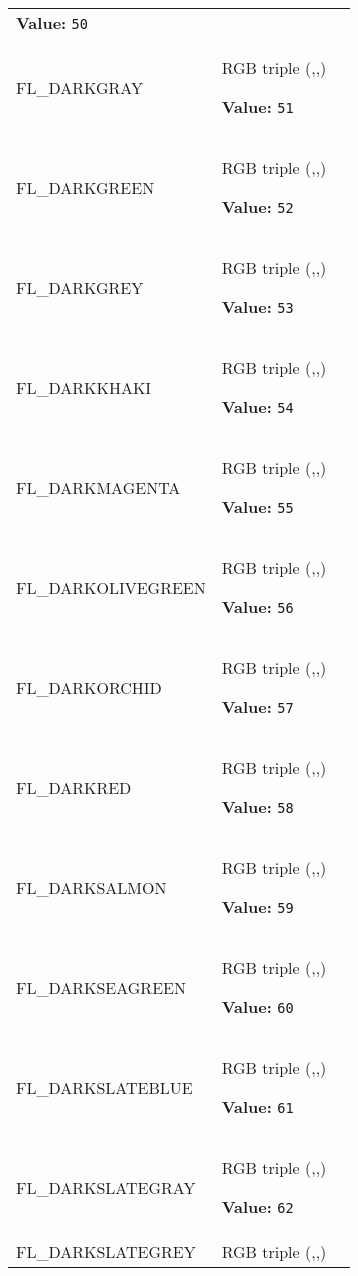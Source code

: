 \begin{longtable}{|p{\varnamewidth}|p{\vardescrwidth}|l}
\textbf{Value:} 
{\tt 50}&\\
\cline{1-2}
\raggedright F\-L\-\_\-D\-A\-R\-K\-G\-R\-A\-Y\- & \raggedright RGB triple (,,)

\textbf{Value:} 
{\tt 51}&\\
\cline{1-2}
\raggedright F\-L\-\_\-D\-A\-R\-K\-G\-R\-E\-E\-N\- & \raggedright RGB triple (,,)

\textbf{Value:} 
{\tt 52}&\\
\cline{1-2}
\raggedright F\-L\-\_\-D\-A\-R\-K\-G\-R\-E\-Y\- & \raggedright RGB triple (,,)

\textbf{Value:} 
{\tt 53}&\\
\cline{1-2}
\raggedright F\-L\-\_\-D\-A\-R\-K\-K\-H\-A\-K\-I\- & \raggedright RGB triple (,,)

\textbf{Value:} 
{\tt 54}&\\
\cline{1-2}
\raggedright F\-L\-\_\-D\-A\-R\-K\-M\-A\-G\-E\-N\-T\-A\- & \raggedright RGB triple (,,)

\textbf{Value:} 
{\tt 55}&\\
\cline{1-2}
\raggedright F\-L\-\_\-D\-A\-R\-K\-O\-L\-I\-V\-E\-G\-R\-E\-E\-N\- & \raggedright RGB triple (,,)

\textbf{Value:} 
{\tt 56}&\\
\cline{1-2}
\raggedright F\-L\-\_\-D\-A\-R\-K\-O\-R\-C\-H\-I\-D\- & \raggedright RGB triple (,,)

\textbf{Value:} 
{\tt 57}&\\
\cline{1-2}
\raggedright F\-L\-\_\-D\-A\-R\-K\-R\-E\-D\- & \raggedright RGB triple (,,)

\textbf{Value:} 
{\tt 58}&\\
\cline{1-2}
\raggedright F\-L\-\_\-D\-A\-R\-K\-S\-A\-L\-M\-O\-N\- & \raggedright RGB triple (,,)

\textbf{Value:} 
{\tt 59}&\\
\cline{1-2}
\raggedright F\-L\-\_\-D\-A\-R\-K\-S\-E\-A\-G\-R\-E\-E\-N\- & \raggedright RGB triple (,,)

\textbf{Value:} 
{\tt 60}&\\
\cline{1-2}
\raggedright F\-L\-\_\-D\-A\-R\-K\-S\-L\-A\-T\-E\-B\-L\-U\-E\- & \raggedright RGB triple (,,)

\textbf{Value:} 
{\tt 61}&\\
\cline{1-2}
\raggedright F\-L\-\_\-D\-A\-R\-K\-S\-L\-A\-T\-E\-G\-R\-A\-Y\- & \raggedright RGB triple (,,)

\textbf{Value:} 
{\tt 62}&\\
\cline{1-2}
\raggedright F\-L\-\_\-D\-A\-R\-K\-S\-L\-A\-T\-E\-G\-R\-E\-Y\- & \raggedright RGB triple (,,)


\end{longtable}
